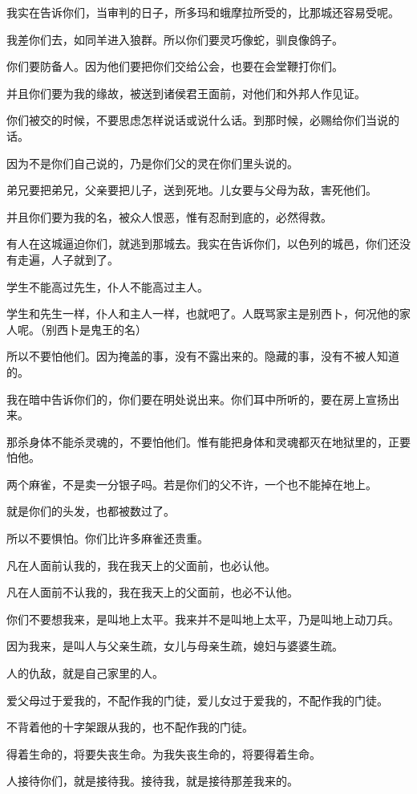 \documentclass[12pt,oneside]{book}
\begin{document}
我实在告诉你们，当审判的日子，所多玛和蛾摩拉所受的，比那城还容易受呢。

我差你们去，如同羊进入狼群。所以你们要灵巧像蛇，驯良像鸽子。

你们要防备人。因为他们要把你们交给公会，也要在会堂鞭打你们。

并且你们要为我的缘故，被送到诸侯君王面前，对他们和外邦人作见证。

你们被交的时候，不要思虑怎样说话或说什么话。到那时候，必赐给你们当说的话。

因为不是你们自己说的，乃是你们父的灵在你们里头说的。

弟兄要把弟兄，父亲要把儿子，送到死地。儿女要与父母为敌，害死他们。

并且你们要为我的名，被众人恨恶，惟有忍耐到底的，必然得救。

有人在这城逼迫你们，就逃到那城去。我实在告诉你们，以色列的城邑，你们还没有走遍，人子就到了。

学生不能高过先生，仆人不能高过主人。

学生和先生一样，仆人和主人一样，也就吧了。人既骂家主是别西卜，何况他的家人呢。（别西卜是鬼王的名）

所以不要怕他们。因为掩盖的事，没有不露出来的。隐藏的事，没有不被人知道的。

我在暗中告诉你们的，你们要在明处说出来。你们耳中所听的，要在房上宣扬出来。

那杀身体不能杀灵魂的，不要怕他们。惟有能把身体和灵魂都灭在地狱里的，正要怕他。

两个麻雀，不是卖一分银子吗。若是你们的父不许，一个也不能掉在地上。

就是你们的头发，也都被数过了。

所以不要惧怕。你们比许多麻雀还贵重。

凡在人面前认我的，我在我天上的父面前，也必认他。

凡在人面前不认我的，我在我天上的父面前，也必不认他。

你们不要想我来，是叫地上太平。我来并不是叫地上太平，乃是叫地上动刀兵。

因为我来，是叫人与父亲生疏，女儿与母亲生疏，媳妇与婆婆生疏。

人的仇敌，就是自己家里的人。

爱父母过于爱我的，不配作我的门徒，爱儿女过于爱我的，不配作我的门徒。

不背着他的十字架跟从我的，也不配作我的门徒。

得着生命的，将要失丧生命。为我失丧生命的，将要得着生命。

人接待你们，就是接待我。接待我，就是接待那差我来的。
\end{document}
